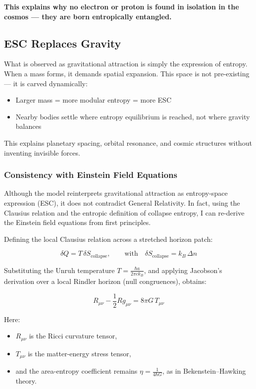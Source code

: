 \documentclass[12pt]{article}
\begin{document}
\noindent
\textbf{This explains why no electron or proton is found in isolation in the cosmos — they are born entropically entangled.}

\subsection{ESC Replaces Gravity}

What is observed as gravitational attraction is simply the expression of entropy. When a mass forms, it demands spatial expansion. This space is not pre-existing — it is carved dynamically:
\begin{itemize}
    \item Larger mass = more modular entropy = more ESC
    \item Nearby bodies settle where entropy equilibrium is reached, not where gravity balances
\end{itemize}

This explains planetary spacing, orbital resonance, and cosmic structures without inventing invisible forces.

\subsubsection*{Consistency with Einstein Field Equations}

Although the model reinterprets gravitational attraction as entropy-space expression (ESC), it does not contradict General Relativity. In fact, using the Clausius relation and the entropic definition of collapse entropy, I can re-derive the Einstein field equations from first principles.

Defining the local Clausius relation across a stretched horizon patch:

\[
\delta Q = T \, \delta S_{\!\text{collapse}}, \qquad \text{with} \quad \delta S_{\!\text{collapse}} = k_{\!B} \, \Delta n
\]

Substituting the Unruh temperature \( T = \frac{\hbar a}{2\pi c k_{\!B}} \), and applying Jacobson’s derivation over a local Rindler horizon (null congruences), obtains:

\[
R_{\mu\nu} - \frac{1}{2} R g_{\mu\nu} = 8\pi G \, T_{\mu\nu}
\]

Here:
\begin{itemize}
    \item \( R_{\mu\nu} \) is the Ricci curvature tensor,
    \item \( T_{\mu\nu} \) is the matter-energy stress tensor,
    \item and the area-entropy coefficient remains \( \eta = \frac{1}{4 \hbar G} \), as in Bekenstein–Hawking theory.
\end{itemize}
\end{document}
